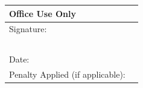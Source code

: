 \begin{table}[!h]
\begin{center}
\small
\begin{tabular}{||p{}|p{}||}
	\hline
	\multicolumn{2}{||l||}{\textbf{Office Use Only}} \\ \hline
	Signature:                       &               \\
	~                                &               \\ \hline
	Date:                            &               \\ \hline
	Penalty Applied (if applicable): &               \\ \hline
\end{tabular}
\end{center}
\end{table}
